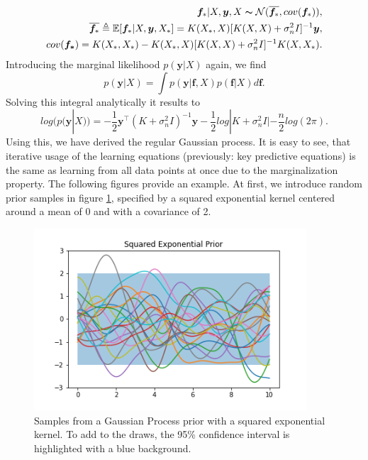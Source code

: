 \begin{subequations}%
	\label{eq: Key predictive equations for Gaussian process regression}
	\begin{align}
	\bm{f}_*|X,\bm{y},X \thicksim \mathcal{N}(\overline{\bm{f}_*}, cov(\bm{f}_*)),         \nonumber \\
	\overline{\bm{f}_*} \triangleq \mathbb{E}[\bm{f}_*|X,\bm{y},X_*] = K(X_*,X)[K(X,X) + \sigma_n^2 I]^{-1}\bm{y},        \nonumber \\
	cov(\bm{f_*}) = K(X_*,X_*) - K(X_*,X)[K(X,X)+ \sigma_n^2 I]^{-1}K(X,X_*).       
	\end{align}
	\label{eq:Key_predictive_equations_for_GP_reg}
\end{subequations}
Introducing the marginal likelihood $p(\bm{y}|X)$ again, we find
\begin{equation}%
	p(\bm{y}|X) = \int p(\bm{y}|\bm{f},X) p(\bm{f}|X) d\bm{f}.
\label{eq:marginal_likelihood_function_space_view}
\end{equation}
Solving this integral analytically it results to
\begin{equation}%
	log \Big(p(\bm{y}|X)\Big) = -\frac{1}{2}\bm{y}^{\top}(K+ \sigma_n^2 I)^{-1}\bm{y} -\frac{1}{2}log|K+ \sigma_n^2 I| - \frac{n}{2}log ( 2\pi).
\label{eq:Log_marginal_likelihood}
\end{equation}
Using this, we have derived the regular Gaussian process. It is easy to see, that iterative usage of the learning equations (previously: key predictive equations) is the same as learning from all data points at once due to the marginalization property. The following figures provide an example. At first, we introduce random prior samples  in figure \ref{fig:prior_squ_exp}, specified by a squared exponential kernel centered around a mean of 0 and with a covariance of 2. 
\begin{figure}[h!]%
	\centering
	\includegraphics[width=4in]{img/05_3/gp_prior.png}
	\caption[GP prior samples]
	{Samples from a Gaussian Process prior with a squared exponential kernel. To add to the draws, the 95\% confidence interval is highlighted with a blue background. }
	\label{fig:prior_squ_exp}
\end{figure}

